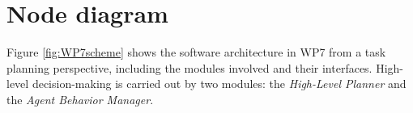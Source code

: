 \section{Node diagram}
\label{sec:NodeDiagram}


Figure \ref{fig:WP7scheme} shows the software architecture in WP7 from a task planning perspective, including the modules involved and their interfaces. High-level decision-making is carried out by two modules: the \textit{High-Level Planner} and the \textit{Agent Behavior Manager}. 

